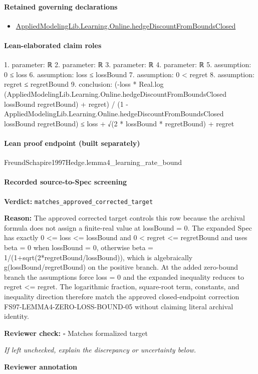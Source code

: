 \documentclass[10pt]{article}
\newcommand{\reviewerbox}{%
  \par\noindent\fbox{\parbox{0.96\linewidth}{\rule{0pt}{0.38in}}}\par
}
\newcommand{\reviewmatch}[1]{%
  \par\noindent\textbf{Reviewer check:} $\square$\; #1\par
  \noindent\emph{If left unchecked, explain the discrepancy or uncertainty below.}\par
}
\begin{document}
\paragraph{Retained governing declarations}
\begin{itemize}\raggedright
\item \hyperlink{governing-declaration-b74a239ac21459e3}{Applied\allowbreak{}Modeling\allowbreak{}Lib.\allowbreak{}Learning.\allowbreak{}Online.\allowbreak{}hedge\allowbreak{}Discount\allowbreak{}From\allowbreak{}Bounds\allowbreak{}Closed}
\end{itemize}
\paragraph{Lean-elaborated claim roles}\begin{ReviewVerbatim}
1. parameter: ℝ
2. parameter: ℝ
3. parameter: ℝ
4. parameter: ℝ
5. assumption: 0 ≤ loss
6. assumption: loss ≤ lossBound
7. assumption: 0 < regret
8. assumption: regret ≤ regretBound
9. conclusion: (-loss * Real.log (AppliedModelingLib.Learning.Online.hedgeDiscountFromBoundsClosed lossBound regretBound) + regret) /
    (1 - AppliedModelingLib.Learning.Online.hedgeDiscountFromBoundsClosed lossBound regretBound) ≤
  loss + √(2 * lossBound * regretBound) + regret
\end{ReviewVerbatim}

\paragraph{Lean proof endpoint (built separately)}\begin{ReviewVerbatim}
FreundSchapire1997Hedge.lemma4_learning_rate_bound
\end{ReviewVerbatim}

\paragraph{Recorded source-to-Spec screening}
\textbf{Verdict:} \texttt{matches\_approved\_corrected\_target}
\\
{\raggedright
\textbf{Reason:} The approved corrected target controls this row because the archival formula does not assign a finite-\allowbreak{}real value at lossBound = 0.\allowbreak{} The expanded Spec has exactly 0 <= loss <= lossBound and 0 < regret <= regretBound and uses beta = 0 when lossBound = 0, otherwise beta = 1/\allowbreak{}(1+sqrt(2*regretBound/\allowbreak{}lossBound)), which is algebraically g(lossBound/\allowbreak{}regretBound) on the positive branch.\allowbreak{} At the added zero-\allowbreak{}bound branch the assumptions force loss = 0 and the expanded inequality reduces to regret <= regret.\allowbreak{} The logarithmic fraction, square-\allowbreak{}root term, constants, and inequality direction therefore match the approved closed-\allowbreak{}endpoint correction FS97-\allowbreak{}LEMMA4-\allowbreak{}ZERO-\allowbreak{}LOSS-\allowbreak{}BOUND-\allowbreak{}05 without claiming literal archival identity.\allowbreak{}
\par}
\reviewmatch{Matches formalized target}
\noindent\textbf{Reviewer annotation}\par
\reviewerbox
\clearpage
\hypertarget{source-claim-479f3689a1324594}{}
\end{document}
